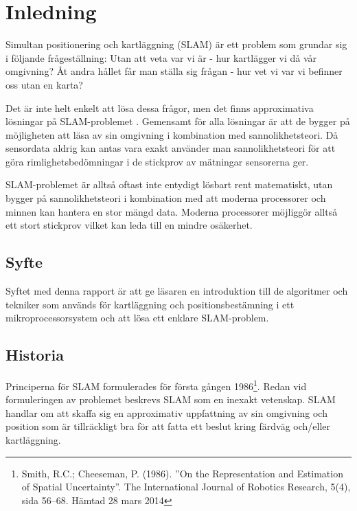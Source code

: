 \documentclass[a4paper,12pt,fleqn]{article}
\begin{document}
\addto\captionsswedish{\renewcommand{\contentsname}{Innehållsförteckning}}

\tableofcontents
\thispagestyle{fancy}
\newpage


\section{Inledning}

Simultan positionering och kartläggning (SLAM) är ett problem som grundar sig i följande frågeställning: Utan att veta var vi är - hur kartlägger vi då vår omgivning? Åt andra hållet får man ställa sig frågan - hur vet vi var vi befinner oss utan en karta?

Det är inte helt enkelt att lösa dessa frågor, men det finns approximativa lösningar på SLAM-problemet . Gemensamt för alla lösningar är att de bygger på möjligheten att läsa av sin omgivning i kombination med
sannolikhetsteori. Då sensordata aldrig kan antas vara exakt använder man sannolikhetsteori för att göra rimlighetsbedömningar i de stickprov av mätningar sensorerna ger.

SLAM-problemet är alltså oftast inte entydigt lösbart rent matematiskt, utan
bygger på sannolikhetsteori i kombination med att moderna processorer
och minnen kan hantera en stor mängd data. Moderna processorer möjliggör
alltså ett stort stickprov vilket kan leda till en mindre osäkerhet.

\subsection{Syfte}
Syftet med denna rapport är att ge läsaren en introduktion till de algoritmer och tekniker som används för kartläggning och positionsbestämning i ett mikroprocessorsystem och att lösa ett enklare SLAM-problem. 

\subsection{Historia}

Principerna för SLAM formulerades för första gången 1986\footnote{Smith, R.C.; Cheeseman, P. (1986).
''On the Representation and Estimation of Spatial Uncertainty''. The
International Journal of Robotics Research, 5(4), sida 56–68. Hämtad 28 mars 2014}. Redan vid formuleringen av problemet beskrevs SLAM som en inexakt vetenskap. SLAM handlar om att skaffa sig en approximativ uppfattning av sin omgivning och position som är tillräckligt bra för att fatta ett beslut kring färdväg och/eller kartläggning. 
\end{document}

